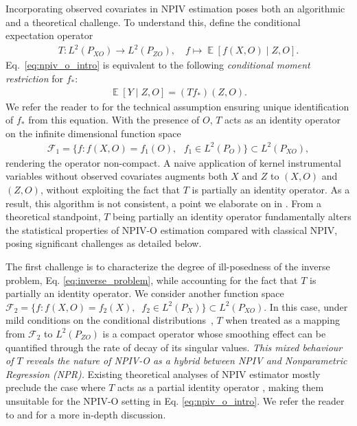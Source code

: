 \documentclass[11pt]{article}
\newcommand{\calF}{\mathcal{F}}
\newcommand{\0}{\mathbf{0}}
\DeclareMathOperator{\E}{\mathbb{E}}
\begin{document}
Incorporating observed covariates in NPIV estimation poses both an algorithmic and a theoretical challenge. To understand this, define the conditional expectation operator
\begin{align*}
    T : L^2(P_{XO}) \to L^2(P_{ZO}), \quad f \mapsto \E[f(X, O)\mid Z, O].
\end{align*}
Eq.~\eqref{eq:npiv_o_intro} is equivalent to the following \emph{conditional moment restriction} for $f_{\ast}$:
\begin{align}\label{eq:inverse_problem}
    \E[Y\mid Z, O]=(Tf_\ast)(Z, O).
\end{align}
We refer the reader to  for the technical assumption ensuring unique identification of $f_{\ast}$ from this equation.  
With the presence of $O$, $T$ acts as an identity operator on the infinite dimensional function space
\begin{align}
\label{eq:calF_1_espace}
    \calF_1 = \{f : f(X, O) = f_1(O), \text{ } f_1 \in L^2(P_{O})\} \subset L^2(P_{XO}),
\end{align}
rendering the operator non-compact. 
A naive application of kernel instrumental variables without observed covariates \citep{singh2019kernel} augments both $X$ and $Z$ to $(X,O)$ and $(Z,O)$, without exploiting the fact that $T$ is partially an identity operator. As a result, this algorithm is not consistent, a point we elaborate on in . From a theoretical standpoint, $T$ being partially an identity operator fundamentally alters the statistical properties of NPIV-O estimation compared with classical NPIV, posing significant challenges as detailed below.

The first challenge is to characterize the degree of ill-posedness of the inverse problem, Eq. \eqref{eq:inverse_problem}, while accounting for the fact that $T$ is partially an identity operator. We consider another function space $\calF_2 = \{f : f(X, O) = f_2(X), \;\; f_2 \in L^2(P_{X})\} \subset L^2(P_{XO})$. In this case, under mild conditions on the conditional distributions~\citep[Assumption A.1]{darolles2011nonparametric}, $T$ when treated as a mapping from $\calF_2$ to $L^2(P_{ZO})$ is a compact operator whose smoothing effect can be quantified through the rate of decay of its singular values. \emph{This mixed behaviour of $T$ reveals the nature of NPIV-O as a hybrid between NPIV and Nonparametric Regression (NPR).} Existing theoretical analyses of NPIV estimator mostly preclude the case where $T$ acts as a partial identity operator \citep{blundell2007semi, chen2011rate, chen2012estimation, Chen_2018, meunier2024nonparametricinstrumentalregressionkernel, kim2025optimality,chen2024adaptiveestimationuniformconfidence}, making them unsuitable for the NPIV-O setting in Eq. \eqref{eq:npiv_o_intro}. We refer the reader to  and  for a more in-depth discussion.
\end{document}
